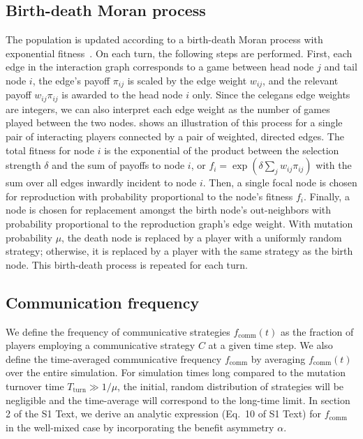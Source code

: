 \documentclass[10pt,letterpaper]{article}
\begin{document}
\subsection{Birth-death Moran process}\label{sec:evo_setup}
The population is updated according to a birth-death Moran process
with exponential fitness~\cite{lieberman2005evolutionary}.
On each turn, the following steps are performed.
First, each edge in the interaction graph corresponds to a game
between head node $j$ and tail node $i$,
the edge's payoff $\pi_{ij}$ is scaled by the edge weight $w_{ij}$,
and the relevant payoff $w_{ij} \pi_{ij}$ is awarded to the head node
$i$ only.
Since the \gls{celegans} edge weights are integers,
we can also interpret each edge weight as the number of games played
between the two nodes.
 shows an illustration of this process
for a single pair of interacting players connected by a pair of
weighted, directed edges.
The total fitness for node $i$ is the exponential of the product
between the selection strength $\delta$
and the sum of payoffs to node $i$,
or $f_i = \exp(\delta \sum_j w_{ij} \pi_{ij})$ with the sum
over all edges inwardly incident to node $i$.
Then, a single focal node is chosen for reproduction
with probability proportional to the node's fitness $f_i$.
Finally, a node is chosen for replacement amongst the birth node's out-neighbors
with probability proportional to the reproduction graph's edge weight.
With mutation probability $\mu$,
the death node is replaced by a player with a uniformly random strategy;
otherwise, it is replaced by a player with the same strategy as the birth node.
This birth-death process is repeated for each turn.

\subsection{Communication frequency}
We define the frequency of communicative strategies
$f_{\text{comm}}(t)$ as the fraction of players employing
a communicative strategy $C$ at a given time step.
We also define the time-averaged communicative frequency
$f_{\text{comm}}$
by averaging $f_{\text{comm}}(t)$ over the entire simulation.
For simulation times long compared to the mutation turnover time
$T_{\text{turn}} \gg 1/\mu$,
the initial, random distribution of strategies will be negligible
and the time-average will correspond to the long-time limit.
In section 2 of the S1 Text,
we derive an analytic expression (Eq.\ 10 of S1 Text) for
$f_{\text{comm}}$ in the well-mixed case
by incorporating the benefit asymmetry $\alpha$.
\end{document}
